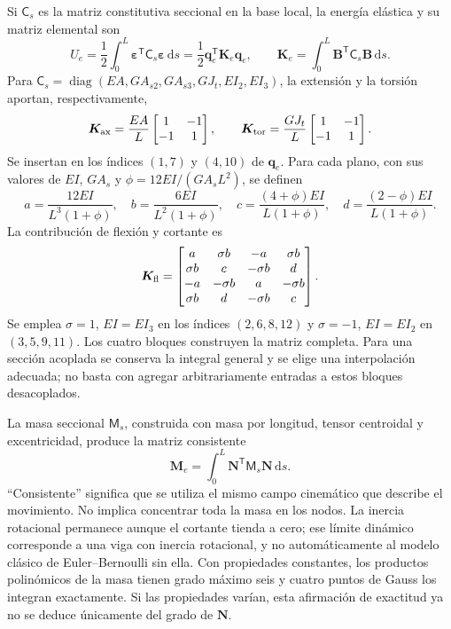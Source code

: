 \documentclass[11pt,a4paper,oneside]{report}
\newcommand{\vct}[1]{\bm{#1}}
\newcommand{\ten}[1]{\boldsymbol{#1}}
\newcommand{\dd}{\mathrm d}
\newcommand{\tr}{\mathsf T}
\newcommand{\diag}{\operatorname{diag}}
\begin{document}
Si $\mathsf C_s$ es la matriz constitutiva seccional en la base local, la energía
elástica y su matriz elemental son
\begin{equation}
 U_e=\frac12\int_0^L\vct\varepsilon^{\tr}\mathsf C_s\vct\varepsilon\,\dd s
 =\frac12\vct q_e^{\tr}\ten K_e\vct q_e,
 \qquad
 \ten K_e=\int_0^L\ten B^{\tr}\mathsf C_s\ten B\,\dd s.
\end{equation}
Para $\mathsf C_s=\diag(EA,GA_{s2},GA_{s3},GJ_t,EI_2,EI_3)$, la extensión y la
torsión aportan, respectivamente,
\begin{equation}
 \ten K_{\rm ax}=\frac{EA}{L}\begin{bmatrix}1&-1\\-1&1\end{bmatrix},
 \qquad
 \ten K_{\rm tor}=\frac{GJ_t}{L}\begin{bmatrix}1&-1\\-1&1\end{bmatrix}.
\end{equation}
Se insertan en los índices $(1,7)$ y $(4,10)$ de $\vct q_e$. Para cada plano,
con sus valores de $EI$, $GA_s$ y $\phi=12EI/(GA_sL^2)$, se definen
\begin{equation}
 a=\frac{12EI}{L^3(1+\phi)},\quad b=\frac{6EI}{L^2(1+\phi)},\quad
 c=\frac{(4+\phi)EI}{L(1+\phi)},\quad d=\frac{(2-\phi)EI}{L(1+\phi)}.
\end{equation}
La contribución de flexión y cortante es
\begin{equation}
 \ten K_{\rm fl}=\begin{bmatrix}
 a&\sigma b&-a&\sigma b\\
 \sigma b&c&-\sigma b&d\\
 -a&-\sigma b&a&-\sigma b\\
 \sigma b&d&-\sigma b&c
 \end{bmatrix}.
\end{equation}
Se emplea $\sigma=1$, $EI=EI_3$ en los índices $(2,6,8,12)$ y
$\sigma=-1$, $EI=EI_2$ en $(3,5,9,11)$. Los cuatro bloques construyen la
matriz completa. Para una sección acoplada se conserva la integral general y
se elige una interpolación adecuada; no basta con agregar arbitrariamente
entradas a estos bloques desacoplados.

La masa seccional $\mathsf M_s$, construida con masa por longitud, tensor
centroidal y excentricidad, produce la matriz consistente
\begin{equation}
 \ten M_e=\int_0^L\ten N^{\tr}\mathsf M_s\ten N\,\dd s.
 \label{eq:fe-masa}
\end{equation}
``Consistente'' significa que se utiliza el mismo campo cinemático que
describe el movimiento. No implica concentrar toda la masa en los nodos. La
inercia rotacional permanece aunque el cortante tienda a cero; ese límite
dinámico corresponde a una viga con inercia rotacional, y no automáticamente
al modelo clásico de Euler--Bernoulli sin ella. Con propiedades constantes,
los productos polinómicos de la masa tienen grado máximo seis y cuatro puntos
de Gauss los integran exactamente. Si las propiedades varían, esta afirmación
de exactitud ya no se deduce únicamente del grado de $\ten N$.
\end{document}
